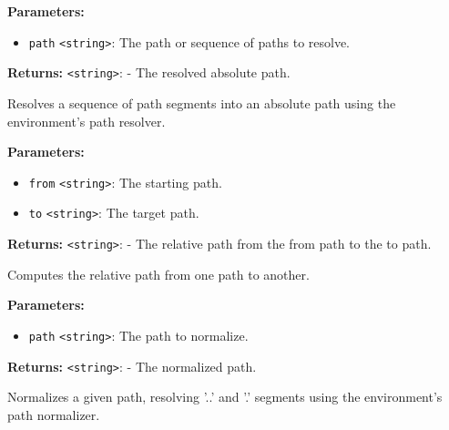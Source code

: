 \documentclass[12pt,a4paper]{article}
\begin{document}
\noindent \textbf{Parameters:}
\begin{itemize}
  \item \texttt{path} \texttt{<string>}: The path or sequence of paths to resolve.
\end{itemize}

\noindent \textbf{Returns:} \texttt{<string>}: - The resolved absolute path.

\noindent Resolves a sequence of path segments into an absolute path using the environment's path resolver.

\vspace{5mm}
\noindent {}


\noindent \textbf{Parameters:}
\begin{itemize}
  \item \texttt{from} \texttt{<string>}: The starting path.
  \item \texttt{to} \texttt{<string>}: The target path.
\end{itemize}

\noindent \textbf{Returns:} \texttt{<string>}: - The relative path from the \textasciigrave{}from\textasciigrave{} path to the \textasciigrave{}to\textasciigrave{} path.

\noindent Computes the relative path from one path to another.

\vspace{5mm}
\noindent {}


\noindent \textbf{Parameters:}
\begin{itemize}
  \item \texttt{path} \texttt{<string>}: The path to normalize.
\end{itemize}

\noindent \textbf{Returns:} \texttt{<string>}: - The normalized path.

\noindent Normalizes a given path, resolving '..' and '.' segments using the environment's path normalizer.

\vspace{5mm}
\noindent {}
\end{document}
